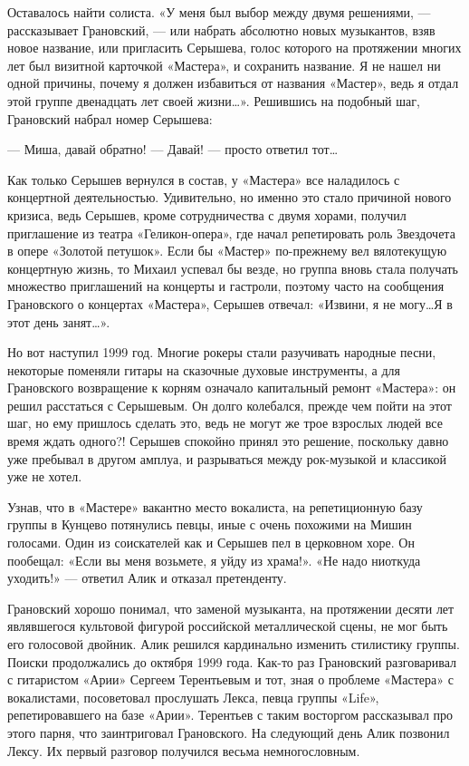 \documentclass[10pt, twoside]{book}
\begin{document}
Оставалось найти солиста. «У меня был выбор между двумя решениями, — рассказывает Грановский, — или набрать абсолютно
новых музыкантов, взяв новое название, или пригласить Серышева, голос которого на протяжении многих лет был визитной
карточкой «Мастера», и сохранить название. Я не нашел ни одной причины, почему я должен избавиться от названия «Мастер»,
ведь я отдал этой группе двенадцать лет своей жизни\ldots». Решившись на подобный шаг, Грановский набрал номер Серышева:

— Миша, давай обратно!
— Давай! — просто ответил тот\ldots

Как только Серышев вернулся в состав, у «Мастера» все наладилось с концертной деятельностью. Удивительно, но именно это
стало причиной нового кризиса, ведь Серышев, кроме сотрудничества с двумя хорами, получил приглашение из театра
«Геликон-опера», где начал репетировать роль Звездочета в опере «Золотой петушок». Если бы «Мастер» по-прежнему вел
вялотекущую концертную жизнь, то Михаил успевал бы везде, но группа вновь стала получать множество приглашений на
концерты и гастроли, поэтому часто на сообщения Грановского о концертах «Мастера», Серышев отвечал: «Извини, я не
могу\ldots Я в этот день занят\ldots».

Но вот наступил 1999 год. Многие рокеры стали разучивать народные песни, некоторые поменяли гитары на сказочные духовые
инструменты, а для Грановского возвращение к корням означало капитальный ремонт «Мастера»: он решил расстаться с
Серышевым. Он долго колебался, прежде чем пойти на этот шаг, но ему пришлось сделать это, ведь не могут же трое взрослых
людей все время ждать одного?! Серышев спокойно принял это решение, поскольку давно уже пребывал в другом амплуа, и
разрываться между рок-музыкой и классикой уже не хотел.

Узнав, что в «Мастере» вакантно место вокалиста, на репетиционную базу группы в Кунцево потянулись певцы, иные с очень
похожими на Мишин голосами. Один из соискателей как и Серышев пел в церковном хоре. Он пообещал: «Если вы меня возьмете,
я уйду из храма!». «Не надо ниоткуда уходить!» — ответил Алик и отказал претенденту.

Грановский хорошо понимал, что заменой музыканта, на протяжении десяти лет являвшегося культовой фигурой российской
металлической сцены, не мог быть его голосовой двойник. Алик решился кардинально изменить стилистику группы. Поиски
продолжались до октября 1999 года. Как-то раз Грановский разговаривал с гитаристом «Арии» Сергеем Терентьевым и тот,
зная о проблеме «Мастера» с вокалистами, посоветовал прослушать Лекса, певца группы «Life», репетировавшего на базе
«Арии». Терентьев с таким восторгом рассказывал про этого парня, что заинтриговал Грановского. На следующий день Алик
позвонил Лексу. Их первый разговор получился весьма немногословным.
\end{document}
